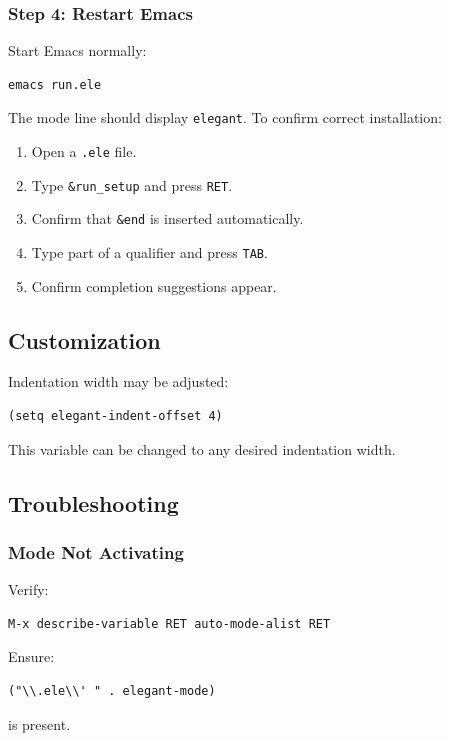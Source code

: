 \subsubsection{Step 4: Restart Emacs}

Start Emacs normally:

\begin{lstlisting}
emacs run.ele
\end{lstlisting}

The mode line should display {\tt {\tt elegant}}.
To confirm correct installation:

\begin{enumerate}[noitemsep]
\item Open a \texttt{.ele} file.
\item Type \texttt{\&run_setup} and press \texttt{RET}.
\item Confirm that \texttt{\&end} is inserted automatically.
\item Type part of a qualifier and press \texttt{TAB}.
\item Confirm completion suggestions appear.
\end{enumerate}

\subsection{Customization}

Indentation width may be adjusted:
\begin{lstlisting}
(setq elegant-indent-offset 4)
\end{lstlisting}

This variable can be changed to any desired indentation width.

\subsection{Troubleshooting}

\subsubsection{Mode Not Activating}

Verify:
\begin{lstlisting}
M-x describe-variable RET auto-mode-alist RET
\end{lstlisting}

Ensure:
\begin{lstlisting}
("\\.ele\\' " . elegant-mode)
\end{lstlisting}
is present.

